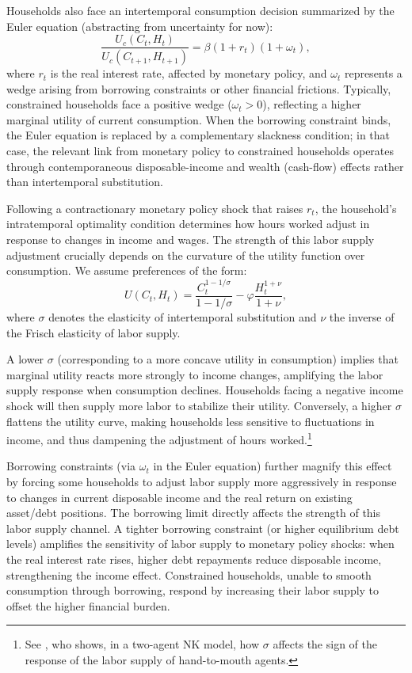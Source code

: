 \documentclass[a4paper,12pt]{article}%
\begin{document}
Households also face an intertemporal consumption decision summarized by the Euler equation (abstracting from uncertainty for now):
\begin{equation}
\frac{U_c(C_t,H_t)}{U_c(C_{t+1},H_{t+1})} = \beta (1 + r_t)(1 + \omega_t),
\end{equation}
where \( r_t \) is the real interest rate, affected by monetary policy, and \( \omega_t \) represents a wedge arising from borrowing constraints or other financial frictions. Typically, constrained households face a positive wedge (\( \omega_t > 0 \)), reflecting a higher marginal utility of current consumption. When the borrowing constraint binds, the Euler equation is replaced by a complementary slackness condition; in that case, the relevant link from monetary policy to constrained households operates through contemporaneous disposable-income and wealth (cash-flow) effects rather than intertemporal substitution.

Following a contractionary monetary policy shock that raises \( r_t \), the household's intratemporal optimality condition determines how hours worked adjust in response to changes in income and wages. The strength of this labor supply adjustment crucially depends on the curvature of the utility function over consumption. We assume preferences of the form:
\[
U(C_t, H_t) = \frac{C_t^{1 - 1/\sigma}}{1 - 1/\sigma} - \varphi \frac{H_t^{1 + \nu}}{1 + \nu},
\]
where \( \sigma \) denotes the elasticity of intertemporal substitution and \( \nu \) the inverse of the Frisch elasticity of labor supply.

A lower \( \sigma \) (corresponding to a more concave utility in consumption) implies that marginal utility reacts more strongly to income changes, amplifying the labor supply response when consumption declines. Households facing a negative income shock will then supply more labor to stabilize their utility. Conversely, a higher \( \sigma \) flattens the utility curve, making households less sensitive to fluctuations in income, and thus dampening the adjustment of hours worked.\footnote{See \cite{Bilbiie:2008}, who shows, in a two-agent NK model, how \( \sigma \) affects the sign of the response of the labor supply of hand-to-mouth agents.} 

Borrowing constraints (via \( \omega_t \) in the Euler equation) further magnify this effect by forcing some households to adjust labor supply more aggressively in response to changes in current disposable income and the real return on existing asset/debt positions. The borrowing limit directly affects the strength of this labor supply channel. A tighter borrowing constraint (or higher equilibrium debt levels) amplifies the sensitivity of labor supply to monetary policy shocks: when the real interest rate rises, higher debt repayments reduce disposable income, strengthening the income effect. Constrained households, unable to smooth consumption through borrowing, respond by increasing their labor supply to offset the higher financial burden.
\end{document}
